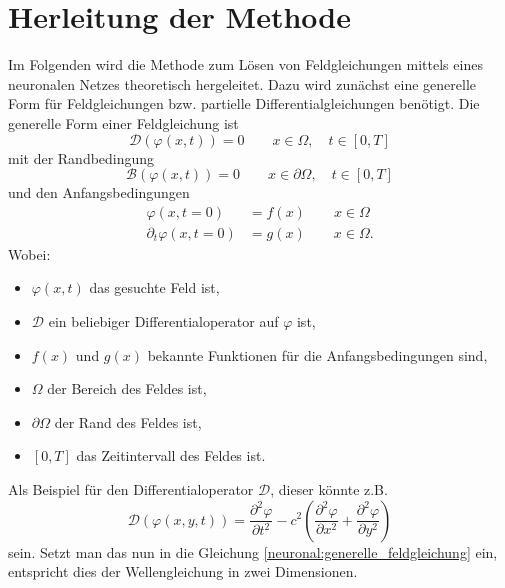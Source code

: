 %
%
%
%

\section{Herleitung der Methode\label{neuronal:section:herleitung}}

Im Folgenden wird die Methode zum Lösen von Feldgleichungen mittels eines neuronalen Netzes theoretisch hergeleitet.
Dazu wird zunächst eine generelle Form für Feldgleichungen bzw. partielle Differentialgleichungen benötigt.
Die generelle Form einer Feldgleichung ist
\begin{equation}
\mathcal{D}(\varphi(x, t)) = 0 \qquad x \in \Omega, \quad t \in [0,T]
\label{neuronal:generelle_feldgleichung}
\end{equation}
mit der Randbedingung
\begin{equation}
\mathcal{B}(\varphi(x, t)) = 0 \qquad x \in \partial \Omega, \quad t \in [0,T]
\end{equation}
und den Anfangsbedingungen
\begin{equation}
    \begin{aligned}
        \varphi(x, t = 0) &= f(x) \qquad x \in \Omega \\
        \partial_t \varphi(x, t = 0) &= g(x) \qquad x \in \Omega.
    \end{aligned}
\end{equation}
Wobei:
\begin{itemize}
    \item $\varphi(x, t)$ das gesuchte Feld ist,
    \item $\mathcal{D}$ ein beliebiger Differentialoperator auf $\varphi$ ist,
    \item $f(x)$ und $g(x)$ bekannte Funktionen für die Anfangsbedingungen sind,
    \item $\Omega$ der Bereich des Feldes ist,
    \item $\partial \Omega$ der Rand des Feldes ist,
    \item $[0,T]$ das Zeitintervall des Feldes ist.
\end{itemize}
Als Beispiel für den Differentialoperator $\mathcal{D}$, dieser könnte z.B.
\begin{equation*}
    \mathcal{D}(\varphi(x, y, t)) = \frac{\partial^2 \varphi}{\partial t^2} - c^2 \left( \frac{\partial^2 \varphi}{\partial x^2} + \frac{\partial^2 \varphi}{\partial y^2} \right)
\end{equation*}
sein. Setzt man das nun in die Gleichung \eqref{neuronal:generelle_feldgleichung} ein, entspricht dies der Wellengleichung in zwei Dimensionen.

